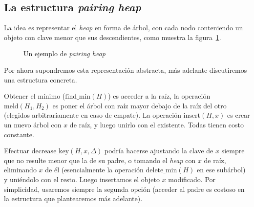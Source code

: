 \subsection{La estructura \emph{pairing heap}}
\label{sec:pairing-heap}

  La idea es representar el \emph{\foreignlanguage{english}{heap}}
  en forma de árbol,
  con cada nodo conteniendo un objeto con clave menor que sus descendientes,
  como muestra la figura~\ref{fig:pairing-heap}.
  \begin{figure}[ht]
    \centering
    \caption{Un ejemplo de \emph{pairing heap}}
    \label{fig:pairing-heap}
  \end{figure}
  Por ahora supondremos esta representación abstracta,
  más adelante discutiremos una estructura concreta.

  Obtener el mínimo
  (\(\mathrm{find\_min}(H)\))
  es acceder a la raíz,
  la operación \(\mathrm{meld}(H_1, H_2)\)
  es poner el árbol con raíz mayor debajo de la raíz del otro
  (elegidos arbitrariamente en caso de empate).
  La operación \(\mathrm{insert}(H, x)\)
  es crear un nuevo árbol con \(x\) de raíz,
  y luego unirlo con el existente.
  Todas tienen costo constante.

  Efectuar \(\mathrm{decrease\_key}(H, x, \Delta)\)
  podría hacerse ajustando la clave de \(x\)
  siempre que no resulte menor que la de su padre,
  o tomando el \emph{\foreignlanguage{english}{heap}} con \(x\) de raíz,
  eliminando \(x\) de él
  (esencialmente la operación \(\mathrm{delete\_min}(H)\)
   en ese subárbol)
  y uniéndolo con el resto.
  Luego insertamos el objeto \(x\) modificado.
  Por simplicidad,
  usaremos siempre la segunda opción
  (acceder al padre es costoso en la estructura que plantearemos más adelante).


